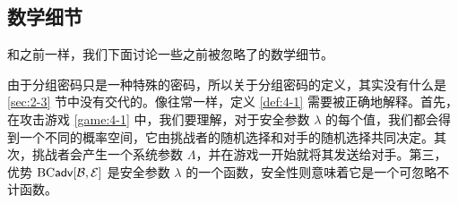 \subsection{数学细节}\label{subsec:4-1-5}

和之前一样，我们下面讨论一些之前被忽略了的数学细节。

由于分组密码只是一种特殊的密码，所以关于分组密码的定义，其实没有什么是 \ref{sec:2-3} 节中没有交代的。像往常一样，定义 \ref{def:4-1} 需要被正确地解释。首先，在攻击游戏 \ref{game:4-1} 中，我们要理解，对于安全参数 $\lambda$ 的每个值，我们都会得到一个不同的概率空间，它由挑战者的随机选择和对手的随机选择共同决定。其次，挑战者会产生一个系统参数 $\Lambda$，并在游戏一开始就将其发送给对手。第三，优势 ${\rm BC\mathsf{adv}}[\mathcal{B},\mathcal{E}]$ 是安全参数 $\lambda$ 的一个函数，安全性则意味着它是一个可忽略不计函数。